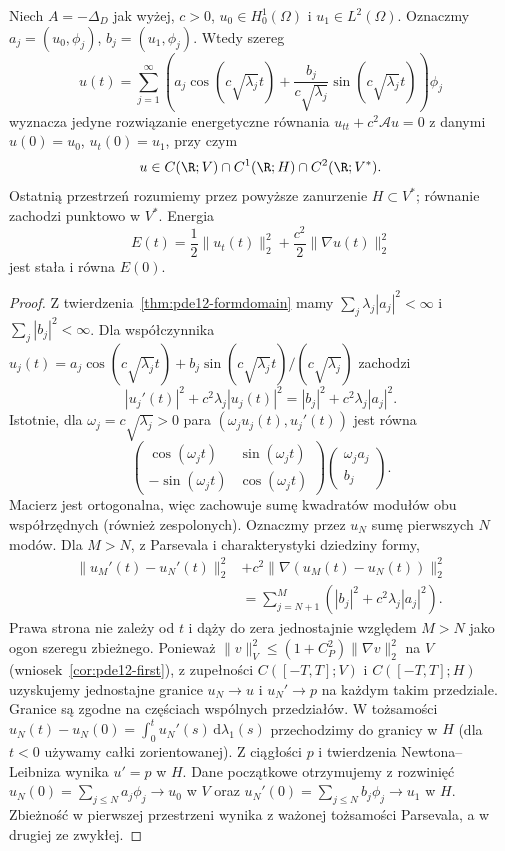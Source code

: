 \begin{twierdzenie}
\label{thm:pde12-wave}
Niech $A=-\Delta_D$ jak wyżej, $c>0$,
$u_0\in H_0^1(\Omega)$ i $u_1\in L^2(\Omega)$.
Oznaczmy $a_j=(u_0,\phi_j)$, $b_j=(u_1,\phi_j)$.
Wtedy szereg
\[
u(t)=\sum_{j=1}^\infty
\left(a_j\cos(c\sqrt{\lambda_j}t)
+\frac{b_j}{c\sqrt{\lambda_j}}\sin(c\sqrt{\lambda_j}t)\right)\phi_j
\]
wyznacza jedyne rozwiązanie energetyczne równania
$u_{tt}+c^2\mathcal Au=0$ z danymi $u(0)=u_0$,
$u_t(0)=u_1$, przy czym
\[
 u\in C(\R;V)\cap C^1(\R;H)\cap C^2(\R;V^*).
\]
Ostatnią przestrzeń rozumiemy przez powyższe zanurzenie
$H\subset V^*$; równanie zachodzi punktowo w $V^*$.
Energia
\[
E(t)=\frac12\|u_t(t)\|_2^2+
\frac{c^2}{2}\|\nabla u(t)\|_2^2
\]
jest stała i równa $E(0)$.
\end{twierdzenie}
\begin{proof}
Z twierdzenia~\ref{thm:pde12-formdomain} mamy
$\sum_j\lambda_j|a_j|^2<\infty$ i
$\sum_j|b_j|^2<\infty$. Dla współczynnika
$u_j(t)=a_j\cos(c\sqrt{\lambda_j}t)
+b_j\sin(c\sqrt{\lambda_j}t)/(c\sqrt{\lambda_j})$
zachodzi
\[
|u_j'(t)|^2+c^2\lambda_j|u_j(t)|^2
=|b_j|^2+c^2\lambda_j|a_j|^2.
\]
Istotnie, dla $\omega_j=c\sqrt{\lambda_j}>0$
para $(\omega_j u_j(t),u_j'(t))$ jest równa
\[
 \begin{pmatrix}\cos(\omega_jt)&\sin(\omega_jt)\\
 -\sin(\omega_jt)&\cos(\omega_jt)\end{pmatrix}
 \begin{pmatrix}\omega_j a_j\\b_j\end{pmatrix}.
\]
Macierz jest ortogonalna, więc zachowuje sumę kwadratów
modułów obu współrzędnych (również zespolonych).
Oznaczmy przez $u_N$ sumę pierwszych $N$ modów.
Dla $M>N$, z Parsevala i charakterystyki dziedziny formy,
\begin{align*}
 \|u_M'(t)-u_N'(t)\|_2^2
 &+c^2\|\nabla(u_M(t)-u_N(t))\|_2^2\\
 &=\sum_{j=N+1}^{M}(|b_j|^2+c^2\lambda_j|a_j|^2).
\end{align*}
Prawa strona nie zależy od $t$ i dąży do zera
jednostajnie względem $M>N$ jako ogon szeregu zbieżnego.
Ponieważ $\|v\|_V^2\le(1+C_P^2)\|\nabla v\|_2^2$
na $V$ (wniosek~\ref{cor:pde12-first}), z zupełności
$C([-T,T];V)$ i $C([-T,T];H)$ uzyskujemy jednostajne
granice $u_N\to u$ i $u_N'\to p$ na każdym takim przedziale.
Granice są zgodne na częściach wspólnych przedziałów.
W tożsamości
$u_N(t)-u_N(0)=\int_0^t u_N'(s)\,\mathrm d\lambda_1(s)$
przechodzimy do granicy w $H$ (dla $t<0$ używamy
całki zorientowanej). Z ciągłości $p$ i twierdzenia
Newtona--Leibniza wynika $u'=p$ w $H$.
Dane początkowe otrzymujemy z rozwinięć
$u_N(0)=\sum_{j\le N}a_j\phi_j\to u_0$ w $V$
oraz $u_N'(0)=\sum_{j\le N}b_j\phi_j\to u_1$ w $H$.
Zbieżność w pierwszej przestrzeni wynika z ważonej
tożsamości Parsevala, a w drugiej ze zwykłej.


\end{proof}
